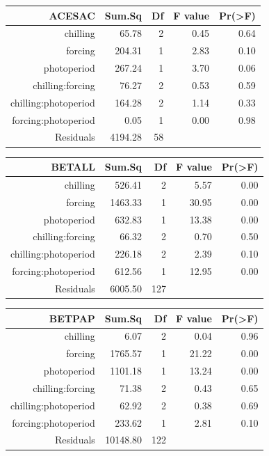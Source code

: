 \documentclass{article}\usepackage[]{graphicx}\usepackage[]{color}
\begin{document}
\begin{table}[ht]
\centering
\begin{tabular}{rrrrr}
  \hline
  ACESAC & Sum.Sq & Df & F value & Pr(>F) \\
 \hline
chilling & 65.78 &   2 & 0.45 & 0.64 \\ 
  forcing & 204.31 &   1 & 2.83 & 0.10 \\ 
  photoperiod & 267.24 &   1 & 3.70 & 0.06 \\ 
  chilling:forcing & 76.27 &   2 & 0.53 & 0.59 \\ 
  chilling:photoperiod & 164.28 &   2 & 1.14 & 0.33 \\ 
  forcing:photoperiod & 0.05 &   1 & 0.00 & 0.98 \\ 
  Residuals & 4194.28 &  58 &  &  \\ 
   \hline
\end{tabular}
\end{table}
\begin{table}[ht]
\centering
\begin{tabular}{rrrrr}
  \hline
  BETALL & Sum.Sq & Df & F value & Pr(>F) \\
 \hline
chilling & 526.41 &   2 & 5.57 & 0.00 \\ 
  forcing & 1463.33 &   1 & 30.95 & 0.00 \\ 
  photoperiod & 632.83 &   1 & 13.38 & 0.00 \\ 
  chilling:forcing & 66.32 &   2 & 0.70 & 0.50 \\ 
  chilling:photoperiod & 226.18 &   2 & 2.39 & 0.10 \\ 
  forcing:photoperiod & 612.56 &   1 & 12.95 & 0.00 \\ 
  Residuals & 6005.50 & 127 &  &  \\ 
   \hline
\end{tabular}
\end{table}
\begin{table}[ht]
\centering
\begin{tabular}{rrrrr}
  \hline
  BETPAP & Sum.Sq & Df & F value & Pr(>F) \\
 \hline
chilling & 6.07 &   2 & 0.04 & 0.96 \\ 
  forcing & 1765.57 &   1 & 21.22 & 0.00 \\ 
  photoperiod & 1101.18 &   1 & 13.24 & 0.00 \\ 
  chilling:forcing & 71.38 &   2 & 0.43 & 0.65 \\ 
  chilling:photoperiod & 62.92 &   2 & 0.38 & 0.69 \\ 
  forcing:photoperiod & 233.62 &   1 & 2.81 & 0.10 \\ 
  Residuals & 10148.80 & 122 &  &  \\ 
   \hline
\end{tabular}
\end{table}
\end{document}
